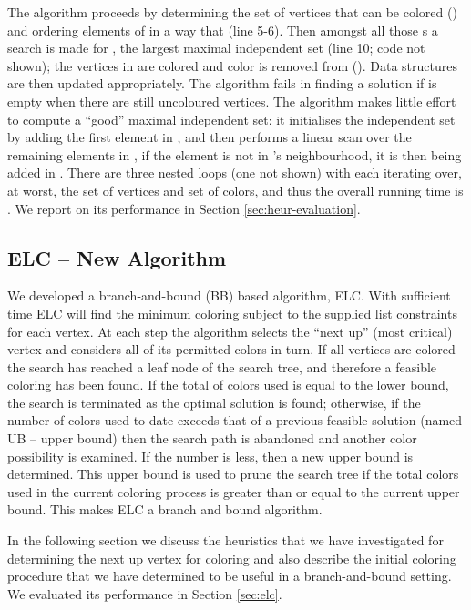 \documentclass[10pt]{article}
\begin{document}
The algorithm proceeds by determining  the set of vertices that can
be colored  () and ordering elements of 
in a way that  (line 5-6).  Then amongst
all those s a search is made for , the largest maximal
independent set (line 10; code not shown); the vertices in  are colored  and color  is removed from  ().  Data structures are then updated appropriately.
The algorithm fails in finding a solution if  is empty when there
are still uncoloured vertices. The algorithm makes little effort to
compute a ``good'' maximal independent set: it initialises the independent set  by 
adding the first element in , and then performs a linear scan over the remaining 
elements in ,  if the element is not in 's neighbourhood, it is then being added in .  
There are three nested loops (one not shown) with each iterating over, at worst, the 
set of vertices and set of colors, and thus the overall running time is .
We report on its performance in Section \ref{sec:heur-evaluation}.

\subsection{ELC -- New Algorithm}\label{sec:aelc}

We developed a branch-and-bound (BB) based algorithm, ELC.  With sufficient time ELC will find the minimum
coloring subject to the supplied list constraints for each vertex.  At each step the algorithm
selects the ``next up'' (most critical) vertex and considers all of its
permitted colors in turn. If all vertices are colored the
search has reached a leaf node of the search tree, and therefore a feasible coloring has been found. If the total
of colors used is equal to the lower bound, the search is terminated as the optimal solution is found;
otherwise, if the number of colors used to date exceeds that of a
previous feasible solution (named UB -- upper bound) then the search path is
abandoned and another color possibility is examined.  If the number is
less, then a new upper bound is determined.  This upper bound is used to
prune the search tree if the total colors used in the current coloring
process is greater than or equal to the current upper bound.  This makes
ELC a branch and bound algorithm.

In the following section we discuss the heuristics that we have
investigated for determining the next up vertex for coloring and also describe
the initial coloring procedure that we have determined to be useful in a
branch-and-bound setting. We evaluated its performance in Section
\ref{sec:elc}.
\end{document}
